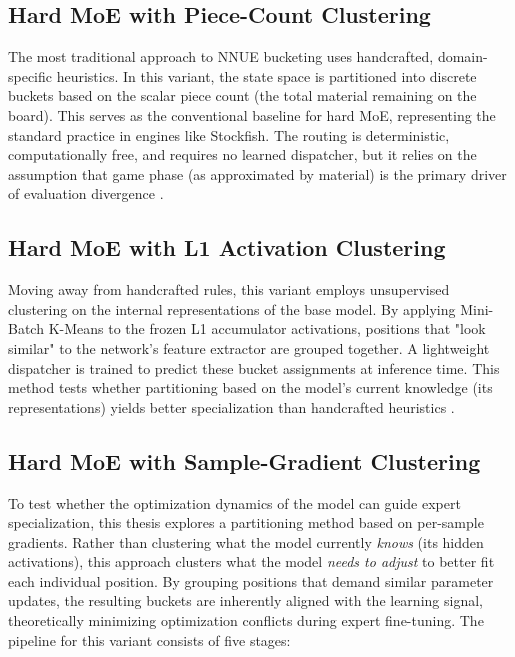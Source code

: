\subsection{Hard MoE with Piece-Count Clustering}

The most traditional approach to NNUE bucketing uses handcrafted, domain-specific heuristics. In this variant, the state space is partitioned into discrete buckets based on the scalar piece count (the total material remaining on the board). This serves as the conventional baseline for hard MoE, representing the standard practice in engines like Stockfish. The routing is deterministic, computationally free, and requires no learned dispatcher, but it relies on the assumption that game phase (as approximated by material) is the primary driver of evaluation divergence \parencite{stockfish}.

\subsection{Hard MoE with L1 Activation Clustering}

Moving away from handcrafted rules, this variant employs unsupervised clustering on the internal representations of the base model. By applying Mini-Batch K-Means to the frozen L1 accumulator activations, positions that "look similar" to the network's feature extractor are grouped together. A lightweight dispatcher is trained to predict these bucket assignments at inference time. This method tests whether partitioning based on the model's current knowledge (its representations) yields better specialization than handcrafted heuristics \parencite{sculley2010}.

\subsection{Hard MoE with Sample-Gradient Clustering}

To test whether the optimization dynamics of the model can guide expert specialization, this thesis explores a partitioning method based on per-sample gradients. Rather than clustering what the model currently \emph{knows} (its hidden activations), this approach clusters what the model \emph{needs to adjust} to better fit each individual position. By grouping positions that demand similar parameter updates, the resulting buckets are inherently aligned with the learning signal, theoretically minimizing optimization conflicts during expert fine-tuning. The pipeline for this variant consists of five stages:

